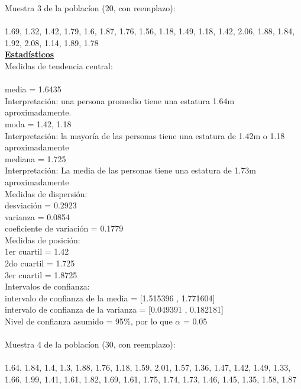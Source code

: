 \documentclass[a4paper,12pt]{article}
\begin{document}
\begin{enumerate}
\newpage
Muestra 3 de la poblac\'ion (20, con reemplazo): \\\\
1.69,	1.32,	1.42,	1.79,	1.6,    1.87,
1.76,	1.56,	1.18,	1.49,	1.18,	1.42,
2.06,	1.88,	1.84,	1.92,	2.08,	1.14,
1.89,	1.78\\

\textbf{\underline{Estad\'isticos}} \\

Medidas de tendencia central:\\\\
media =  1.6435\\
Interpretaci\'on: una persona promedio tiene una estatura 1.64m aproximadamente.\\
moda =  1.42, 1.18\\
Interpretaci\'on: la mayor\'ia de las personas tiene una estatura de 1.42m o 1.18 aproximadamente\\
mediana =  1.725\\
Interpretación: La media de las personas tiene una estatura de 1.73m aproximadamente\\

Medidas de dispersi\'on:\\
desviaci\'on = 0.2923\\
varianza =  0.0854\\
coeficiente de variaci\'on = 0.1779\\

Medidas de posici\'on:\\
1er cuartil = 1.42\\
2do cuartil = 1.725\\
3er cuartil = 1.8725\\

Intervalos de confianza:\\
intervalo de confianza de la media = [1.515396 ,  1.771604]\\
intervalo de confianza de la varianza = [0.049391 ,  0.182181]\\
Nivel de confianza asumido = 95$\%$, por lo que $\alpha$ = 0.05\\\\

Muestra 4 de la poblac\'ion (30, con reemplazo): \\\\

1.64,	1.84,	1.4,    1.3,    1.88,	1.76,
1.18,	1.59,	2.01,	1.57,	1.36,	1.47,
1.42,	1.49,	1.33,	1.66,	1.99,	1.41,
1.61,	1.82,	1.69,	1.61,	1.75,	1.74,
1.73,	1.46,	1.45,	1.35,	1.58,	1.87\\


\end{enumerate}
\end{document}
